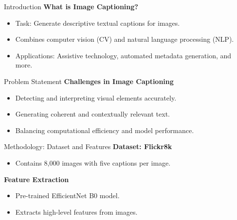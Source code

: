 \documentclass[10pt]{beamer}
\institute{Universit\"at Hamburg\\\trinstitute}
\title{\trtitle}
\subtitle{\trtype}
\author{\trauthor}
\date{}
\theoremstyle{remark}
\begin{document}
\renewcommand{\arraystretch}{1.2}

\begin{frame}[plain]
  \titlepage
\end{frame}


\begin{frame}{Introduction}
	\textbf{What is Image Captioning?}
	\begin{itemize}
			\item Task: Generate descriptive textual captions for images.
			\item Combines computer vision (CV) and natural language processing (NLP).
			\item Applications: Assistive technology, automated metadata generation, and more.
	\end{itemize}
\end{frame}

\begin{frame}{Problem Statement}
	\textbf{Challenges in Image Captioning}
	\begin{itemize}
			\item Detecting and interpreting visual elements accurately.
			\item Generating coherent and contextually relevant text.
			\item Balancing computational efficiency and model performance.
	\end{itemize}
\end{frame}

\begin{frame}{Methodology: Dataset and Features}
	\textbf{Dataset: Flickr8k}
	\begin{itemize}
			\item Contains 8,000 images with five captions per image.
	\end{itemize}
	\textbf{Feature Extraction}
	\begin{itemize}
			\item Pre-trained EfficientNet B0 model.
			\item Extracts high-level features from images.
	\end{itemize}
\end{frame}
\end{document}
